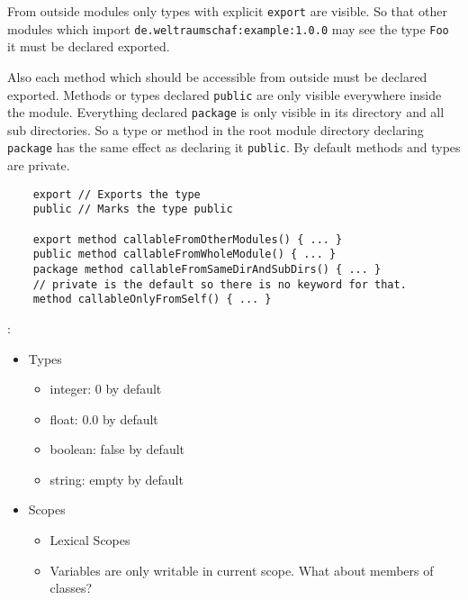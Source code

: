 \documentclass[a4paper,12pt]{article}
\begin{document}
From outside modules only types with explicit \verb|export| are visible. So that other modules which import \verb|de.weltraumschaf:example:1.0.0| may see the type \verb|Foo| it must be declared exported.

Also each method which should be accessible from outside must be declared exported. Methods or types declared \verb|public| are only visible everywhere inside the module. Everything declared \verb|package| is only visible in its directory and all sub directories. So a type or method in the root module directory declaring \verb|package| has the same effect as declaring it \verb|public|. By default methods and types are private.

\begin{verbatim}
	export // Exports the type
	public // Marks the type public
	
	export method callableFromOtherModules() { ... }
	public method callableFromWholeModule() { ... }
	package method callableFromSameDirAndSubDirs() { ... }
	// private is the default so there is no keyword for that.
	method callableOnlyFromSelf() { ... }
\end{verbatim}

:

\begin{itemize}
	\item Types
  	\begin{itemize}
  		\item integer: 0 by default
  		\item float: 0.0 by default
  		\item boolean: false by default
  		\item string: empty by default
  	\end{itemize} 
  	\item Scopes
  	\begin{itemize}
  		\item Lexical Scopes
  		\item Variables are only writable in current scope. What about members of classes?
  	\end{itemize}
\end{itemize}

\newpage
\end{document}
